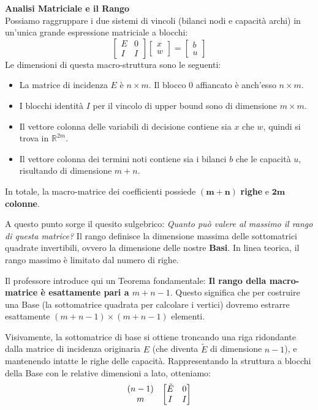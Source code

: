 \documentclass[12pt, a4paper]{article}
\begin{document}
	\vspace{0.4cm}
	\textbf{Analisi Matriciale e il Rango}\\
	Possiamo raggruppare i due sistemi di vincoli (bilanci nodi e capacità archi) in un'unica grande espressione matriciale a blocchi:
	\[
	\begin{bmatrix}
		E & 0 \\
		I & I
	\end{bmatrix}
	\begin{bmatrix}
		x \\
		w
	\end{bmatrix}
	=
	\begin{bmatrix}
		b \\
		u
	\end{bmatrix}
	\]
	Le dimensioni di questa macro-struttura sono le seguenti:
	\begin{itemize}[label=$\circ$, itemsep=2pt, leftmargin=1.5cm]
		\item La matrice di incidenza $E$ è $n \times m$. Il blocco $0$ affiancato è anch'esso $n \times m$.
		\item I blocchi identità $I$ per il vincolo di upper bound sono di dimensione $m \times m$.
		\item Il vettore colonna delle variabili di decisione contiene sia $x$ che $w$, quindi si trova in $\mathbb{R}^{2m}$.
		\item Il vettore colonna dei termini noti contiene sia i bilanci $b$ che le capacità $u$, risultando di dimensione $m + n$.
	\end{itemize}
	In totale, la macro-matrice dei coefficienti possiede $\mathbf{(m+n)}$ \textbf{righe} e $\mathbf{2m}$ \textbf{colonne}.
	
	A questo punto sorge il quesito sulgebrico: \textit{Quanto può valere al massimo il rango di questa matrice?}
	Il rango definisce la dimensione massima delle sottomatrici quadrate invertibili, ovvero la dimensione delle nostre \textbf{Basi}. In linea teorica, il rango massimo è limitato dal numero di righe.
	
	Il professore introduce qui un Teorema fondamentale: \textbf{Il rango della macro-matrice è esattamente pari a $m+n-1$}.
	Questo significa che per costruire una Base (la sottomatrice quadrata per calcolare i vertici) dovremo estrarre esattamente $(m+n-1) \times (m+n-1)$ elementi. 
	
	Visivamente, la sottomatrice di base si ottiene troncando una riga ridondante dalla matrice di incidenza originaria $E$ (che diventa $\tilde{E}$ di dimensione $n-1$), e mantenendo intatte le righe delle capacità. 
	Rappresentando la struttura a blocchi della Base con le relative dimensioni a lato, otteniamo:
	\[
	\begin{array}{c@{\quad}c}
		\begin{matrix} (n-1) \\ m \end{matrix} & 
		\begin{bmatrix} 
			\tilde{E} & 0 \\ 
			I & I 
		\end{bmatrix}
	\end{array}
	\]
	
\end{document}
